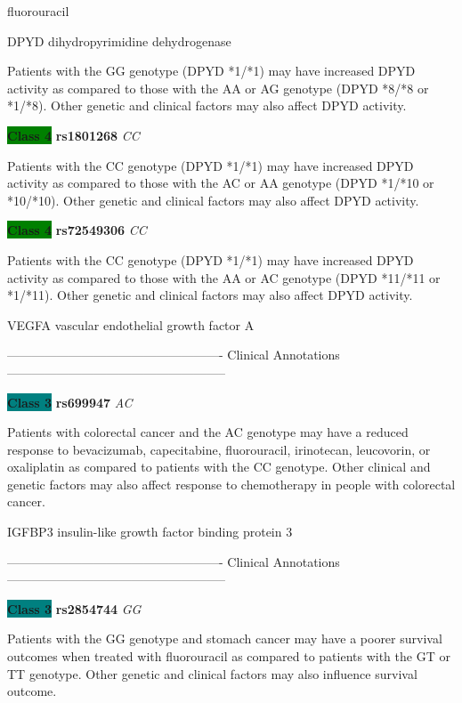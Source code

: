 \documentclass{resume} %
\begin{document}
\begin{rSection}{ fluorouracil }
\begin{rSubsection}{ DPYD }{ dihydropyrimidine dehydrogenase }{}{}
\item[] Patients with the GG genotype (DPYD *1/*1) may have increased DPYD activity as compared to those with the AA or AG genotype (DPYD *8/*8 or *1/*8). Other genetic and clinical factors may also affect DPYD activity. \item \textbf{\colorbox{green} {Class 4}} \textbf{ rs1801268 } \textit{ CC }
\item[] Patients with the CC genotype (DPYD *1/*1) may have increased DPYD activity as compared to those with the AC or AA genotype (DPYD *1/*10 or *10/*10). Other genetic and clinical factors may also affect DPYD activity. \item \textbf{\colorbox{green} {Class 4}} \textbf{ rs72549306 } \textit{ CC }
\item[] Patients with the CC genotype (DPYD *1/*1) may have increased DPYD activity as compared to those with the AA or AC genotype (DPYD *11/*11 or *1/*11). Other genetic and clinical factors may also affect DPYD activity.
\end{rSubsection}\begin{rSubsection}{ VEGFA }{ vascular endothelial growth factor A }{}{}
\item[]

\item[] ---------------------------------------------------- Clinical Annotations -----------------------------------------------------\newline
\item \textbf{\colorbox{teal} {Class 3}} \textbf{ rs699947 } \textit{ AC }
\item[] Patients with colorectal cancer and the AC genotype may have a reduced response to bevacizumab, capecitabine, fluorouracil, irinotecan, leucovorin, or oxaliplatin as compared to patients with the CC genotype. Other clinical and genetic factors may also affect response to chemotherapy in people with colorectal cancer.
\end{rSubsection}\begin{rSubsection}{ IGFBP3 }{ insulin-like growth factor binding protein 3 }{}{}
\item[]

\item[] ---------------------------------------------------- Clinical Annotations -----------------------------------------------------\newline
\item \textbf{\colorbox{teal} {Class 3}} \textbf{ rs2854744 } \textit{ GG }
\item[] Patients with the GG genotype and stomach cancer may have a poorer survival outcomes when treated with fluorouracil as compared to patients with the GT or TT genotype. Other genetic and clinical factors may also influence survival outcome.
\end{rSubsection}


\end{rSection}
\end{document}
